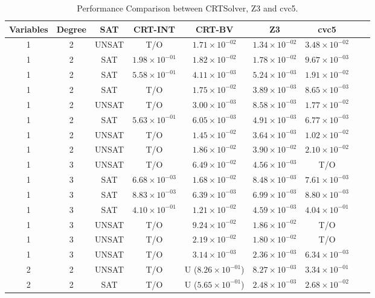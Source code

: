 \begin{table}
  \caption{Performance Comparison between CRTSolver, Z3 and cvc5.}
  \label{table:results}
  \begin{tabular}{ccccccccc}
    \toprule
    Variables & Degree & SAT & CRT-INT & CRT-BV & Z3 & cvc5 \\
    \midrule
1 & 2 & UNSAT & T/O & $1.71 \times 10^{-02}$ & $1.34 \times 10^{-02}$ & $3.48 \times 10^{-02}$ \\
1 & 2 & SAT & $1.98 \times 10^{-01}$ & $1.82 \times 10^{-02}$ & $1.78 \times 10^{-02}$ & $9.67 \times 10^{-03}$ \\
1 & 2 & SAT & $5.58 \times 10^{-01}$ & $4.11 \times 10^{-03}$ & $5.24 \times 10^{-03}$ & $1.91 \times 10^{-02}$ \\
1 & 2 & SAT & T/O & $1.75 \times 10^{-02}$ & $3.89 \times 10^{-03}$ & $8.65 \times 10^{-03}$ \\
1 & 2 & UNSAT & T/O & $3.00 \times 10^{-03}$ & $8.58 \times 10^{-03}$ & $1.77 \times 10^{-02}$ \\
1 & 2 & SAT & $5.63 \times 10^{-01}$ & $6.05 \times 10^{-03}$ & $4.91 \times 10^{-03}$ & $6.77 \times 10^{-03}$ \\
1 & 2 & UNSAT & T/O & $1.45 \times 10^{-02}$ & $3.64 \times 10^{-03}$ & $1.02 \times 10^{-02}$ \\
1 & 2 & UNSAT & T/O & $1.86 \times 10^{-02}$ & $3.90 \times 10^{-02}$ & $2.10 \times 10^{-02}$ \\
1 & 3 & UNSAT & T/O & $6.49 \times 10^{-02}$ & $4.56 \times 10^{-03}$ & T/O \\
1 & 3 & SAT & $6.68 \times 10^{-03}$ & $1.68 \times 10^{-02}$ & $8.48 \times 10^{-03}$ & $7.61 \times 10^{-03}$ \\
1 & 3 & SAT & $8.83 \times 10^{-03}$ & $6.39 \times 10^{-03}$ & $6.99 \times 10^{-03}$ & $8.80 \times 10^{-03}$ \\
1 & 3 & SAT & $4.10 \times 10^{-01}$ & $1.21 \times 10^{-02}$ & $4.59 \times 10^{-03}$ & $4.04 \times 10^{-01}$ \\
1 & 3 & UNSAT & T/O & $9.24 \times 10^{-02}$ & $1.86 \times 10^{-02}$ & T/O \\
1 & 3 & UNSAT & T/O & $2.19 \times 10^{-02}$ & $1.80 \times 10^{-02}$ & T/O \\
1 & 3 & UNSAT & T/O & $3.14 \times 10^{-03}$ & $2.36 \times 10^{-03}$ & $6.34 \times 10^{-03}$ \\
2 & 2 & UNSAT & T/O & U ($8.26 \times 10^{-01}$) & $8.27 \times 10^{-03}$ & $3.34 \times 10^{-01}$ \\
2 & 2 & SAT & T/O & U ($5.65 \times 10^{-01}$) & $2.48 \times 10^{-03}$ & $2.68 \times 10^{-02}$ \\

\end{tabular}
\end{table}
